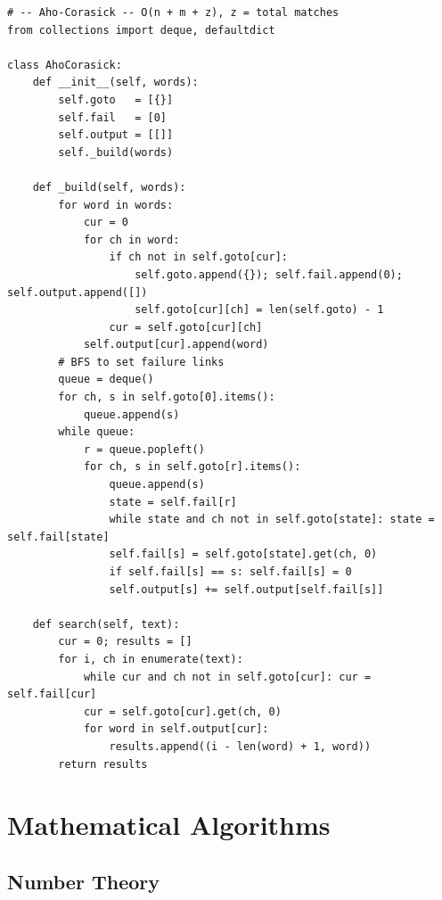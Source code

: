 \documentclass[11pt,a4paper]{report}
\begin{document}
\begin{lstlisting}
# -- Aho-Corasick -- O(n + m + z), z = total matches
from collections import deque, defaultdict

class AhoCorasick:
    def __init__(self, words):
        self.goto   = [{}]
        self.fail   = [0]
        self.output = [[]]
        self._build(words)

    def _build(self, words):
        for word in words:
            cur = 0
            for ch in word:
                if ch not in self.goto[cur]:
                    self.goto.append({}); self.fail.append(0); self.output.append([])
                    self.goto[cur][ch] = len(self.goto) - 1
                cur = self.goto[cur][ch]
            self.output[cur].append(word)
        # BFS to set failure links
        queue = deque()
        for ch, s in self.goto[0].items():
            queue.append(s)
        while queue:
            r = queue.popleft()
            for ch, s in self.goto[r].items():
                queue.append(s)
                state = self.fail[r]
                while state and ch not in self.goto[state]: state = self.fail[state]
                self.fail[s] = self.goto[state].get(ch, 0)
                if self.fail[s] == s: self.fail[s] = 0
                self.output[s] += self.output[self.fail[s]]

    def search(self, text):
        cur = 0; results = []
        for i, ch in enumerate(text):
            while cur and ch not in self.goto[cur]: cur = self.fail[cur]
            cur = self.goto[cur].get(ch, 0)
            for word in self.output[cur]:
                results.append((i - len(word) + 1, word))
        return results
\end{lstlisting}

\chapter{Mathematical Algorithms}

\section{Number Theory}
\end{document}

